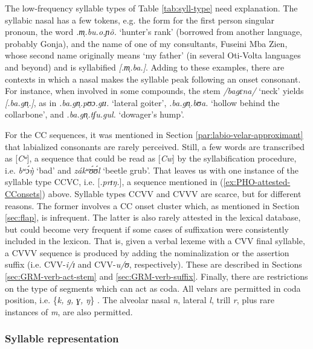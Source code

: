The low-frequency  syllable types  of Table \ref{tab:syll-type} need 
explanation. The syllabic
nasal has a few tokens, e.g.  the form for the
first person singular pronoun,  the word {\it .m̩.bu.o.ɲõ.} `hunter's rank'
(borrowed from another language,  probably Gonja), and  the name of one of
my 
consultants, Fuseini Mba Zien, whose second name  originally means  `my 
father'
 (in several Oti-Volta languages and beyond) and is syllabified {\it 
[{\it.m̩.ba.}]}.  Adding to
these examples,  there are contexts in which  a nasal makes the
syllable
peak
 following an  onset consonant. For instance, when involved in some compounds,
the
stem  {\it /bagɛna/}  `neck'  yields  {\it [.ba.gn̩.]}, as in 
{\it .ba.gn̩.pʊɔ.gɪɪ.} `lateral goiter',  {\it .ba.gn̩.bʊa.} `hollow behind the
collarbone',   and {\it .ba.gn̩.tʃu.gul.}  `dowager's hump'.  

For the CC sequences, it was mentioned in Section 
\ref{par:labio-velar-approximant} that labialized consonants are rarely 
perceived. Still, a few words are transcribed as   [{\it Cʷ}], a sequence that 
could be read as  [{\it Cw}] by the syllabification procedure, i.e.  {\it 
bʷɔ́ŋ̀} `bad' and {\it zákʷʊ́ʊ́l} `beetle grub'.  That leaves us with one  
instance of the syllable type CCVC, i.e. [{\it .prɪŋ.}],  a sequence mentioned 
 in (\ref{ex:PHO-attested-CConsets}) above. Syllable types CCVV and CVVV are 
scarce, but for different reasons. The former involves a CC onset cluster which, 
as mentioned in Section \ref{sec:flap},  is infrequent. The latter is also 
rarely attested in the lexical database,  but could become very frequent if some 
cases of suffixation  were consistently included in the lexicon. That is, given 
a verbal lexeme with a CVV final syllable,  a CVVV sequence is produced by 
adding the nominalization or the assertion suffix  (i.e. CVV-{\it i/ɪ}   and   
CVV-{\it u/ʊ},  respectively).  These are described in Sections 
\ref{sec:GRM-verb-act-stem} and \ref{sec:GRM-verb-suffix}.  Finally, there are 
restrictions on the type of segments which can act as coda. All velars are 
permitted in coda position, i.e. \{{\it k, g, ɣ, ŋ}\} . The alveolar nasal {\it 
n},   lateral {\it l},  trill {\it r}, plus rare instances of {\it m},  are 
also permitted. 



\subsubsection{Syllable representation}
\label{sec:syllable-types}

